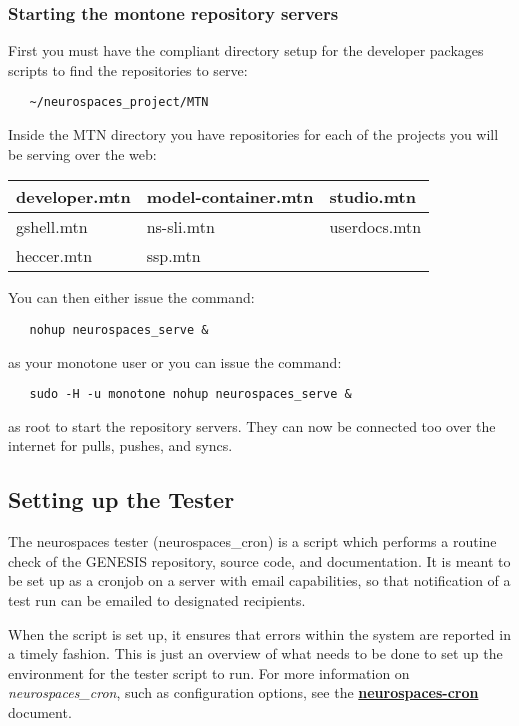 \documentclass[12pt]{article}
\begin{document}
\subsubsection*{Starting the montone repository servers}

First you must have the compliant directory setup for the developer packages scripts to find the repositories to serve:
\begin{verbatim}
   ~/neurospaces_project/MTN
\end{verbatim}
Inside the MTN directory you have repositories for each of the projects you will be serving over the web:

\vspace*{3mm}
\begin{tabular}{| l | l |  l |}
\hline
developer.mtn & model-container.mtn & studio.mtn      \\ \hline
gshell.mtn        & ns-sli.mtn                     & userdocs.mtn \\ \hline
heccer.mtn       & ssp.mtn                        &                          \\ \hline
\end{tabular}
\vspace*{3mm}

You can then either issue the command:
\begin{verbatim}
   nohup neurospaces_serve &
\end{verbatim}
as your monotone user or you can issue the command:
\begin{verbatim}
   sudo -H -u monotone nohup neurospaces_serve &
\end{verbatim}
as root to start the repository servers. They can now be connected too over the internet for pulls, pushes, and syncs.

\subsection*{Setting up the Tester}

The neurospaces tester (neurospaces\_cron) is a script which performs a routine check of the GENESIS repository, source code, and documentation. It is meant to be set up as a cronjob on a server with email capabilities, so that notification of a test run can be emailed to designated recipients.

When the script is set up, it ensures that errors within the system are reported in a timely fashion. This is just an overview of what needs to be done to set up the environment for the tester script to run. For more information on {\it neurospaces\_cron}, such as configuration options, see the \href{../neurospaces-cron/neurospaces-cron.tex}{\bf neurospaces-cron} document. 
\end{document}
